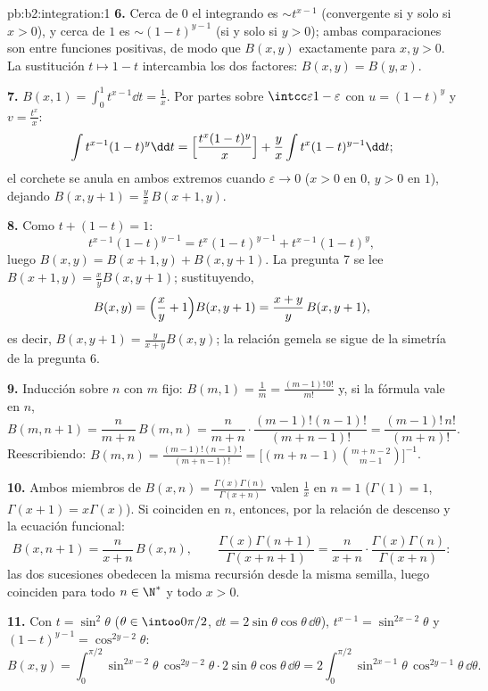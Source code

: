 \begin{solution}{pb:b2:integration:1}
\textbf{6.} Cerca de $0$ el integrando es $\sim t^{x-1}$
(convergente si y solo si $x > 0$), y cerca de $1$ es $\sim
(1-t)^{y-1}$ (si y solo si $y > 0$); ambas comparaciones son entre
funciones positivas, de modo que $B(x,y)$  exactamente para
$x, y > 0$. La sustitución $t \mapsto 1 - t$ intercambia los dos
factores: $B(x,y) = B(y,x)$.

\textbf{7.} $B(x,1) = \int_0^1 t^{x-1}\dd t = \frac1x$. Por partes
sobre $\intcc\varepsilon{1-\varepsilon}$ con $u = (1-t)^y$ y $v =
\frac{t^x}{x}$:
\[
\int t^{x-1}(1-t)^{y}\dd t
= \Bigl[\frac{t^x(1-t)^y}{x}\Bigr]
+ \frac{y}{x}\int t^{x}(1-t)^{y-1}\dd t ;
\]
el corchete se anula en ambos extremos cuando $\varepsilon \to 0$
($x > 0$ en $0$, $y > 0$ en $1$), dejando $B(x, y+1) = \frac
yx\,B(x+1, y)$.

\textbf{8.} Como $t + (1-t) = 1$:
\[
t^{x-1}(1-t)^{y-1} = t^{x}(1-t)^{y-1} + t^{x-1}(1-t)^{y},
\]
luego $B(x,y) = B(x+1,y) + B(x,y+1)$. La pregunta 7 se lee
$B(x+1,y) = \frac xy B(x,y+1)$; sustituyendo,
\[
B(x,y) = \Bigl(\frac xy + 1\Bigr)B(x,y+1)
= \frac{x+y}{y}\,B(x,y+1),
\]
es decir, $B(x,y+1) = \frac{y}{x+y}B(x,y)$; la relación gemela se
sigue de la simetría de la pregunta 6.

\textbf{9.} Inducción sobre $n$ con $m$ fijo: $B(m,1) = \frac1m =
\frac{(m-1)!\,0!}{m!}$ y, si la fórmula vale en $n$,
\[
B(m, n+1) = \frac{n}{m+n}\,B(m,n)
= \frac{n}{m+n}\cdot\frac{(m-1)!(n-1)!}{(m+n-1)!}
= \frac{(m-1)!\,n!}{(m+n)!} .
\]
Reescribiendo: $B(m,n) = \frac{(m-1)!(n-1)!}{(m+n-1)!} =
\bigl[(m+n-1)\binom{m+n-2}{m-1}\bigr]^{-1}$.

\textbf{10.} Ambos miembros de $B(x,n) =
\frac{\Gamma(x)\Gamma(n)}{\Gamma(x+n)}$ valen $\frac1x$ en $n = 1$
($\Gamma(1) = 1$, $\Gamma(x+1) = x\Gamma(x)$). Si coinciden en $n$,
entonces, por la relación de descenso y la ecuación funcional:
\[
B(x, n+1) = \frac{n}{x+n}\,B(x,n), \qquad
\frac{\Gamma(x)\Gamma(n+1)}{\Gamma(x+n+1)}
= \frac{n}{x+n}\cdot
\frac{\Gamma(x)\Gamma(n)}{\Gamma(x+n)} :
\]
las dos sucesiones obedecen la misma recursión desde la misma
semilla, luego coinciden para todo $n \in \N^*$ y todo $x > 0$.

\textbf{11.} Con $t = \sin^2\theta$ ($\theta \in \intoo0{\pi/2}$,
$\dd t = 2\sin\theta\cos\theta\,\dd\theta$), $t^{x-1} =
\sin^{2x-2}\theta$ y $(1-t)^{y-1} = \cos^{2y-2}\theta$:
\[
B(x,y) = \int_0^{\pi/2}\sin^{2x-2}\theta\,\cos^{2y-2}\theta
\cdot 2\sin\theta\cos\theta\,\dd\theta
= 2\int_0^{\pi/2}\sin^{2x-1}\theta\,\cos^{2y-1}\theta\,
\dd\theta .
\]


\end{solution}
